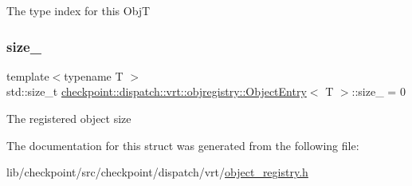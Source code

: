 The type index for this ObjT \mbox{\label{structcheckpoint_1_1dispatch_1_1vrt_1_1objregistry_1_1_object_entry_a4395eb53a4569f96fde3dcf4e9b2ad02}} 
\subsubsection{\texorpdfstring{size\+\_\+}{size\_}}
{\footnotesize\ttfamily template$<$typename T $>$ \\
std\+::size\+\_\+t \hyperlink{structcheckpoint_1_1dispatch_1_1vrt_1_1objregistry_1_1_object_entry}{checkpoint\+::dispatch\+::vrt\+::objregistry\+::\+Object\+Entry}$<$ T $>$\+::size\+\_\+ = 0}

The registered object size 

The documentation for this struct was generated from the following file\+:\begin{DoxyCompactItemize}
\item 
lib/checkpoint/src/checkpoint/dispatch/vrt/\hyperlink{object__registry_8h}{object\+\_\+registry.\+h}\end{DoxyCompactItemize}
